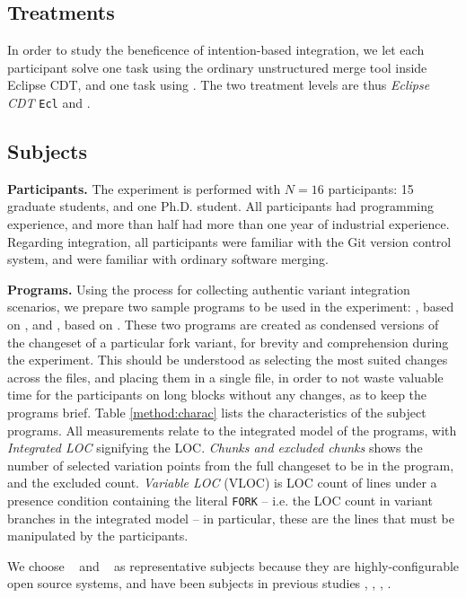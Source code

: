 \subsection{Treatments}
In order to study the beneficence of intention-based integration, we let each participant solve one task using the ordinary unstructured merge tool inside Eclipse CDT, and one task using \tooln. The two treatment levels are thus \textit{Eclipse CDT} \texttt{Ecl} and \textit{\tooln} \inc.

\subsection{Subjects}
\textbf{Participants.}
The experiment is performed with $N=16$ participants: 15 graduate students, and one Ph.D. student. All participants had programming experience, and more than half had more than one year of industrial experience. Regarding integration, all participants were familiar with the Git version control system, and were familiar with ordinary software merging.

\textbf{Programs.} Using the process for collecting authentic variant integration scenarios, we prepare two sample programs to be used in the experiment: \po, based on \busybox, and \pt, based on \vim. These two programs are created as condensed versions of the changeset of a particular fork variant, for brevity and comprehension during the experiment. This should be understood as selecting the most suited changes across the files, and placing them in a single file, in order to not waste valuable time for the participants on long blocks without any changes, as to keep the programs brief. Table \ref{method:charac} lists the characteristics of the subject programs. All measurements relate to the integrated model of the programs, with \textit{Integrated LOC} signifying the LOC. \textit{Chunks and excluded chunks} shows the number of selected variation points from the full changeset to be in the program, and the excluded count. \textit{Variable LOC} (VLOC) is LOC count of lines under a presence condition containing the literal \texttt{FORK} -- i.e. the LOC count in variant branches in the integrated model -- in particular, these are the lines that must be manipulated by the participants.

We choose \busybox~ and \vim~ as representative subjects because they are highly-configurable open source systems, and have been subjects in previous studies \cite{berger2013study}, \cite{liebig2010preprocessor}, \cite{liebig2011discipline}, \cite{hunsen2016}.

